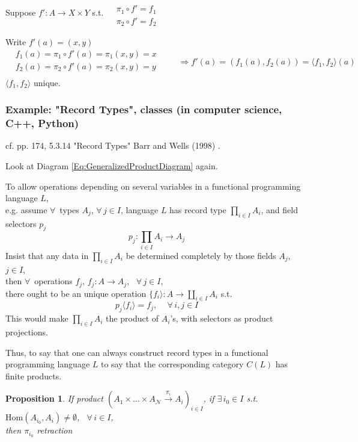 \documentclass[10pt]{amsart}
\newtheorem{proposition}{Proposition}
\begin{document}
\begin{multicols*}{2}
Suppose $f': A \to X\times Y$ s.t. $\begin{aligned} & \quad \\
& \pi_1 \circ f' = f_1 \\
& \pi_2 \circ f' = f_2 \end{aligned}$

Write $f'(a) = (x,y)$
\[
\begin{aligned}
& f_1(a) = \pi_1 \circ f'(a) = \pi_1(x,y) =x \\ 
& f_2(a) = \pi_2 \circ f'(a) = \pi_2(x,y) =y \\ 
\end{aligned} \qquad \, \Longrightarrow f'(a) = (f_1(a), f_2(a)) = \langle f_1, f_2 \rangle (a)
\]
$\langle f_1, f_2 \rangle $ unique.  

\subsubsection{Example: "Record Types", classes (in computer science, C++, Python)}\label{SubSubSec:RecordTypesProduct}

cf. pp. 174, 5.3.14 "Record Types" Barr and Wells (1998) \cite{BW1998}.

Look at Diagram \ref{Eq:GeneralizedProductDiagram} again.

To allow operations depending on several variables in a functional programming language $L$, \\
e.g. assume $\forall \,$ types $A_j$, $\forall \, j \in I$, language $L$ has record type $\prod_{i\in I} A_i$, and field selectors $p_j$
\[
p_j : \prod_{i\in I} A_i \to A_j
\]
Insist that any data in $\prod_{i\in I} A_i$ be determined completely by those fields $A_j$, $j\in I$, \\
then $\forall \, $ operations $f_j$, $f_j : A \to A_j$, \, $\forall \, j \in I$, \\
there ought to be an unique operation $\lbrace f_i \rangle : A \to \coprod_{i\in I} A_i$ s.t. 
\[
p_j\langle f_i \rangle = f_j, \quad \, \forall \, i, j \in I
\]
This would make $\prod_{i\in I} A_i$ the product of $A_i$'s, with selectors as product projections.

Thus, to say that one can always construct record types in a functional programming language $L$ to say that the corresponding category $C(L)$ has finite products. 


\begin{proposition}
	If product $(A_1 \times \dots \times A_{\mathcal{N}} \xrightarrow{ \pi_i } A_i )_{i\in I}$, if $\exists \,  i_0 \in I$ s.t. $\text{Hom}(A_{i_0}, A_i) \neq \emptyset$, \, $\forall \, i \in I$, \\
	then $\pi_{i_0}$ \emph{retraction }
\end{proposition}


\end{multicols*}
\end{document}
